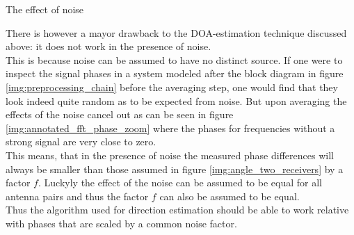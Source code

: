 \begin{subchapter}{The effect of noise}

  There is however a mayor drawback to the DOA-estimation
  technique discussed above: it does not work in the presence of noise. \\

  This is because noise can be assumed to have no distinct source.
  If one were to inspect the signal phases in a system modeled after
  the block diagram in figure \ref{img:preprocessing_chain} before
  the averaging step, one would find that they look indeed quite random
  as to be expected from noise.
  But upon averaging the effects of the noise cancel out as can be seen in figure
  \ref{img:annotated_fft_phase_zoom} where the phases for frequencies
  without a strong signal are very close to zero. \\

  This means, that in the presence of noise the measured phase differences
  will always be smaller than those assumed in figure \ref{img:angle_two_receivers}
  by a factor $f$.
  Luckyly the effect of the noise can be assumed to be equal for
  all antenna pairs and thus the factor $f$ can also be assumed to be equal. \\

  Thus the algorithm used for direction estimation
  should be able to work relative with phases that are
  scaled by a common noise factor.
\end{subchapter}

